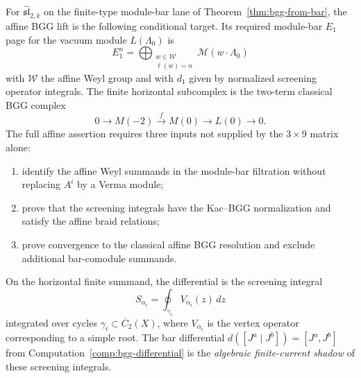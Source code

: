 \begin{theorem}
\label{thm:bgg-sl2-bar-explicit}

For $\widehat{\mathfrak{sl}}_{2,k}$ on the finite-type
module-bar lane of Theorem~\textup{\ref{thm:bgg-from-bar}}, the
affine BGG lift is the following conditional target. Its required
module-bar $E_1$ page for the vacuum module $L(\Lambda_0)$ is
\begin{equation}\label{eq:bgg-E1}
E_1^n = \bigoplus_{\substack{w \in \mathcal{W} \\ \ell(w) = n}}
\mathcal{M}(w \cdot \Lambda_0)
\end{equation}
with $\mathcal{W}$ the affine Weyl group and with $d_1$ given by
normalized screening operator integrals. The finite horizontal
subcomplex is the two-term classical BGG complex
\[
0\to M(-2)\xrightarrow{\,f\,}M(0)\to L(0)\to0.
\]
The full affine assertion requires three inputs not supplied by the
$3\times9$ matrix alone:
\begin{enumerate}[label=\textup{(\roman*)}]
\item identify the affine Weyl summands in the module-bar filtration
without replacing $A^i$ by a Verma module;
\item prove that the screening integrals have the Kac--BGG
normalization and satisfy the affine braid relations;
\item prove convergence to the classical affine BGG resolution and
exclude additional bar-comodule summands.
\end{enumerate}

On the horizontal finite summand, the differential is the screening
integral
\begin{equation}\label{eq:screening-sl2}
S_{\alpha_i} = \oint_{\gamma_i} V_{\alpha_i}(z)\, dz
\end{equation}
integrated over cycles $\gamma_i \subset \overline{C}_2(X)$, where
$V_{\alpha_i}$ is the vertex operator corresponding to a simple
root. The bar differential
$d([J^a \mid J^b]) = [J^a, J^b]$ from
Computation~\textup{\ref{comp:bgg-differential}} is the \emph{algebraic
finite-current shadow} of these screening integrals.
\end{theorem}


